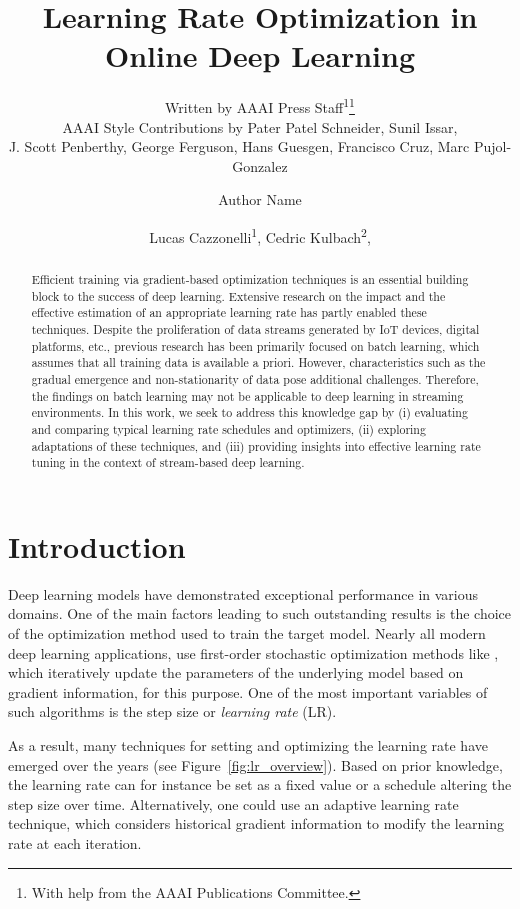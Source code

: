 \documentclass[letterpaper]{article} %
\author{
    Written by AAAI Press Staff\textsuperscript{\rm 1}\thanks{With help from the AAAI Publications Committee.}\\
    AAAI Style Contributions by Pater Patel Schneider,
    Sunil Issar,\\
    J. Scott Penberthy,
    George Ferguson,
    Hans Guesgen,
    Francisco Cruz\equalcontrib,
    Marc Pujol-Gonzalez\equalcontrib}
\author{
    Author Name
}
\title{Learning Rate Optimization in Online Deep Learning}
\author{
    Lucas Cazzonelli\textsuperscript{\rm 1},
    Cedric Kulbach\textsuperscript{\rm 2},
}
\begin{document}
\maketitle


\begin{abstract}
	\noindent Efficient training via gradient-based optimization techniques is an essential building block to the success of deep learning. Extensive research on the impact and the effective estimation of an appropriate learning rate has partly enabled these techniques. Despite the proliferation of data streams generated by IoT devices, digital platforms, etc., previous research has been primarily focused on batch learning, which assumes that all training data is available a priori. However, characteristics such as the gradual emergence and non-stationarity of data pose additional challenges. Therefore, the findings on batch learning may not be applicable to deep learning in streaming environments. In this work, we seek to address this knowledge gap by (i) evaluating and comparing typical learning rate schedules and optimizers, (ii) exploring adaptations of these techniques, and (iii) providing insights into effective learning rate tuning in the context of stream-based deep learning.
\end{abstract}

\section{Introduction}
Deep learning models have demonstrated exceptional performance in various domains.
One of the main factors leading to such outstanding results is the choice of the optimization method used to train the target model.
Nearly all modern deep learning applications, use first-order stochastic optimization methods like , which iteratively update the parameters of the underlying model based on gradient information, for this purpose.
One of the most important variables of such algorithms is the step size or \textit{learning rate} (LR).

As a result, many techniques for setting and optimizing the learning rate have emerged over the years (see Figure~\ref{fig:lr_overview}).
Based on prior knowledge, the learning rate can for instance be set as a fixed value or a schedule altering the step size over time.
Alternatively, one could use an adaptive learning rate technique, which considers historical gradient information to modify the learning rate at each iteration. 
\end{document}
